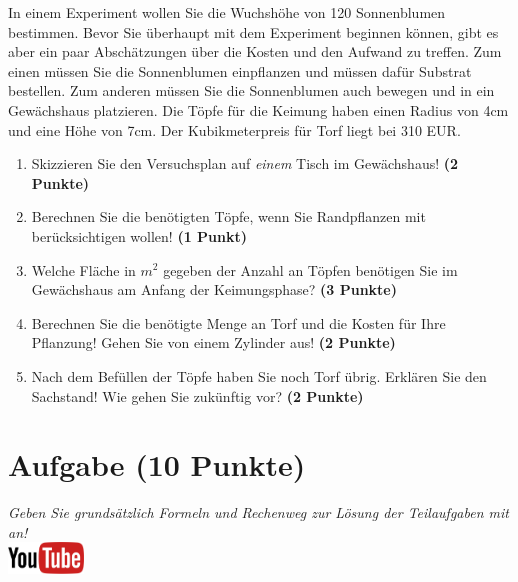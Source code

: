 \documentclass[a4paper, 10pt]{scrartcl}\usepackage[]{graphicx}\usepackage[]{xcolor}
\begin{document}
In einem Experiment wollen Sie die Wuchsh{\"o}he von 120
Sonnenblumen bestimmen. Bevor Sie {\"u}berhaupt mit dem Experiment beginnen
k{\"o}nnen, gibt es aber ein paar Absch{\"a}tzungen {\"u}ber die Kosten und den Aufwand
zu treffen. Zum einen m{\"u}ssen Sie die Sonnenblumen einpflanzen und m{\"u}ssen
daf{\"u}r Substrat bestellen. Zum anderen m{\"u}ssen Sie die Sonnenblumen auch
bewegen und in ein Gew{\"a}chshaus platzieren. Die T{\"o}pfe f{\"u}r die Keimung haben
einen Radius von 4cm und eine H{\"o}he von 7cm. Der
Kubikmeterpreis f{\"u}r Torf liegt bei 310 EUR.

\begin{enumerate}
\item Skizzieren Sie den Versuchsplan auf \textit{einem} Tisch im
  Gew{\"a}chshaus! \textbf{(2 Punkte)}
\item Berechnen Sie die ben{\"o}tigten T{\"o}pfe, wenn Sie Randpflanzen mit
  ber{\"u}cksichtigen wollen! \textbf{(1 Punkt)}
\item Welche Fl{\"a}che in $m^2$ gegeben der Anzahl an T{\"o}pfen ben{\"o}tigen Sie im
  Gew{\"a}chshaus am Anfang der Keimungsphase? \textbf{(3 Punkte)}
\item Berechnen Sie die ben{\"o}tigte Menge an Torf und die Kosten f{\"u}r Ihre
  Pflanzung! Gehen Sie von einem Zylinder aus! \textbf{(2 Punkte)}
\item Nach dem Bef{\"u}llen der T{\"o}pfe haben Sie noch Torf {\"u}brig. Erkl{\"a}ren Sie
  den Sachstand! Wie gehen Sie zuk{\"u}nftig vor? \textbf{(2 Punkte)}
\end{enumerate}


\clearpage\null 
\clearpage

\section{Aufgabe \hfill (10 Punkte)}

\textit{Geben Sie grunds{\"a}tzlich Formeln und Rechenweg zur L{\"o}sung der
  Teilaufgaben mit an!} \\[1Ex]

\hfill\href{https://youtu.be/1B53cVFIU7Q}{\includegraphics[width =
  2cm]{img/youtube}} %
\hspace{2Ex}
\end{document}
